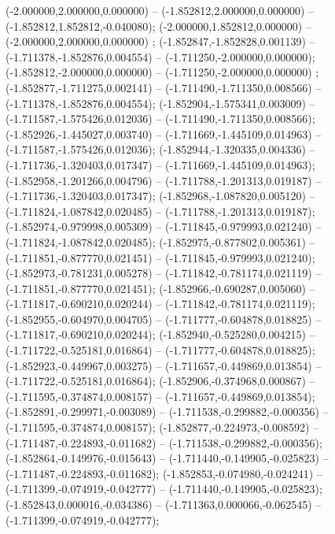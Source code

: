  (-2.000000,2.000000,0.000000) -- (-1.852812,2.000000,0.000000) -- (-1.852812,1.852812,-0.040080);
 (-2.000000,1.852812,0.000000) -- (-2.000000,2.000000,0.000000) ;
 (-1.852847,-1.852828,0.001139) -- (-1.711378,-1.852876,0.004554) -- (-1.711250,-2.000000,0.000000);
 (-1.852812,-2.000000,0.000000) -- (-1.711250,-2.000000,0.000000) ;
 (-1.852877,-1.711275,0.002141) -- (-1.711490,-1.711350,0.008566) -- (-1.711378,-1.852876,0.004554);
 (-1.852904,-1.575341,0.003009) -- (-1.711587,-1.575426,0.012036) -- (-1.711490,-1.711350,0.008566);
 (-1.852926,-1.445027,0.003740) -- (-1.711669,-1.445109,0.014963) -- (-1.711587,-1.575426,0.012036);
 (-1.852944,-1.320335,0.004336) -- (-1.711736,-1.320403,0.017347) -- (-1.711669,-1.445109,0.014963);
 (-1.852958,-1.201266,0.004796) -- (-1.711788,-1.201313,0.019187) -- (-1.711736,-1.320403,0.017347);
 (-1.852968,-1.087820,0.005120) -- (-1.711824,-1.087842,0.020485) -- (-1.711788,-1.201313,0.019187);
 (-1.852974,-0.979998,0.005309) -- (-1.711845,-0.979993,0.021240) -- (-1.711824,-1.087842,0.020485);
 (-1.852975,-0.877802,0.005361) -- (-1.711851,-0.877770,0.021451) -- (-1.711845,-0.979993,0.021240);
 (-1.852973,-0.781231,0.005278) -- (-1.711842,-0.781174,0.021119) -- (-1.711851,-0.877770,0.021451);
 (-1.852966,-0.690287,0.005060) -- (-1.711817,-0.690210,0.020244) -- (-1.711842,-0.781174,0.021119);
 (-1.852955,-0.604970,0.004705) -- (-1.711777,-0.604878,0.018825) -- (-1.711817,-0.690210,0.020244);
 (-1.852940,-0.525280,0.004215) -- (-1.711722,-0.525181,0.016864) -- (-1.711777,-0.604878,0.018825);
 (-1.852923,-0.449967,0.003275) -- (-1.711657,-0.449869,0.013854) -- (-1.711722,-0.525181,0.016864);
 (-1.852906,-0.374968,0.000867) -- (-1.711595,-0.374874,0.008157) -- (-1.711657,-0.449869,0.013854);
 (-1.852891,-0.299971,-0.003089) -- (-1.711538,-0.299882,-0.000356) -- (-1.711595,-0.374874,0.008157);
 (-1.852877,-0.224973,-0.008592) -- (-1.711487,-0.224893,-0.011682) -- (-1.711538,-0.299882,-0.000356);
 (-1.852864,-0.149976,-0.015643) -- (-1.711440,-0.149905,-0.025823) -- (-1.711487,-0.224893,-0.011682);
 (-1.852853,-0.074980,-0.024241) -- (-1.711399,-0.074919,-0.042777) -- (-1.711440,-0.149905,-0.025823);
 (-1.852843,0.000016,-0.034386) -- (-1.711363,0.000066,-0.062545) -- (-1.711399,-0.074919,-0.042777);
